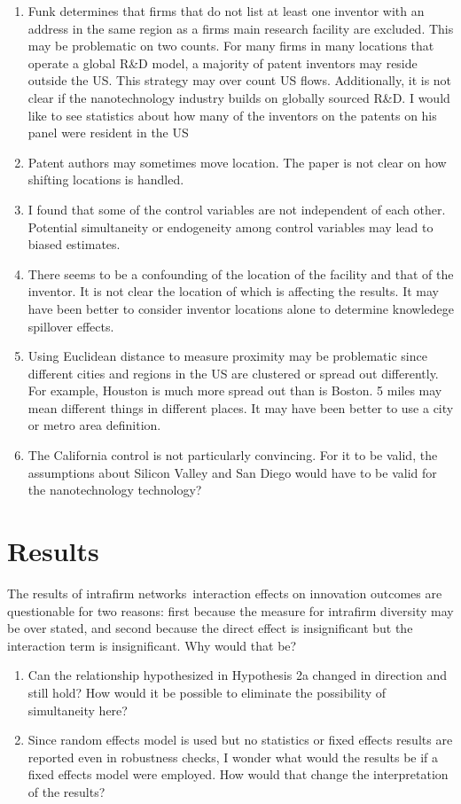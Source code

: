 \documentclass[12pt,letterpaper]{article}
\begin{document}
\begin{enumerate}
   \item Funk determines that firms that do not list at least one inventor with an address in the same region as a firm\textquotesingle s main research facility are excluded. This may be problematic on two counts. For many firms in many locations that operate a global R\&D model, a majority of patent inventors may reside outside the US. This strategy may over count US flows. Additionally, it is not clear if the nanotechnology industry builds on globally sourced R\&D. I would like to see statistics about how many of the inventors on the patents on his panel were resident in the US
  \item Patent authors may sometimes move location. The paper is not clear on how shifting locations is handled.
  \item I found that some of the control variables are not independent of each other. Potential simultaneity or endogeneity among control variables may lead to biased estimates.
  \item There seems to be a confounding of the location of the facility and that of the inventor. It is not clear the location of which is affecting the results. It may have been better to consider inventor locations alone to determine knowledege spillover effects.
  \item Using Euclidean distance to measure proximity may be problematic since different cities and regions in the US are clustered or spread out differently. For example, Houston is much more spread out than is Boston. 5 miles may mean different things in different places. It may have been better to use a city or metro area definition.
  \item The California control is not particularly convincing. For it to be valid, the assumptions about Silicon Valley and San Diego would have to be valid for the nanotechnology technology?
\end{enumerate}

\section{Results}
The results of intrafirm networks\textquotesingle \ interaction effects on innovation outcomes are questionable for two reasons: first because the measure for intrafirm diversity may be over stated, and second because the direct effect is insignificant but the interaction term is insignificant. Why would that be?
\begin{enumerate}
  \item Can the relationship hypothesized in Hypothesis 2a changed in direction and still hold? How would it be possible to eliminate the possibility of simultaneity here?
  \item Since random effects model is used but no statistics or fixed effects results are reported even in robustness checks, I wonder what would the results be if a fixed effects model were employed. How would that change the interpretation of the results?
\end{enumerate}
\end{document}

